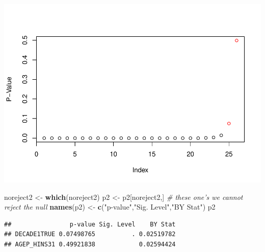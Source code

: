 \documentclass[
]{article}
\newenvironment{Shaded}{\begin{snugshade}}{\end{snugshade}}
\newcommand{\CommentTok}[1]{\textcolor[rgb]{0.56,0.35,0.01}{\textit{#1}}}
\newcommand{\KeywordTok}[1]{\textcolor[rgb]{0.13,0.29,0.53}{\textbf{#1}}}
\newcommand{\NormalTok}[1]{#1}
\newcommand{\StringTok}[1]{\textcolor[rgb]{0.31,0.60,0.02}{#1}}
\begin{document}
\includegraphics{dlassoMarkdown_files/figure-latex/unnamed-chunk-5-1.pdf}

\begin{Shaded}
\begin{Highlighting}[]
\NormalTok{noreject2 <-}\StringTok{ }\KeywordTok{which}\NormalTok{(noreject2)}
\NormalTok{p2 <-}\StringTok{ }\NormalTok{p2[noreject2,]   }\CommentTok{# these one's we cannot reject the null}
\KeywordTok{names}\NormalTok{(p2) <-}\StringTok{ }\KeywordTok{c}\NormalTok{(}\StringTok{"p-value"}\NormalTok{,}\StringTok{"Sig. Level"}\NormalTok{,}\StringTok{"BY Stat"}\NormalTok{)}
\NormalTok{p2}
\end{Highlighting}
\end{Shaded}

\begin{verbatim}
##                p-value Sig. Level    BY Stat
## DECADE1TRUE 0.07498765          . 0.02519782
## AGEP_HINS31 0.49921838            0.02594424
\end{verbatim}
\end{document}
